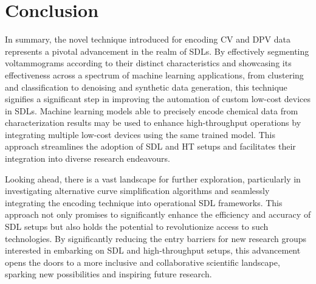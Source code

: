 \chapter{Conclusion} \label{chap:chap-5}
In summary, the novel technique introduced for encoding CV and DPV data represents a pivotal advancement in the realm of SDLs. By effectively segmenting voltammograms according to their distinct characteristics and showcasing its effectiveness across a spectrum of machine learning applications, from clustering and classification to denoising and synthetic data generation, this technique signifies a significant step in improving the automation of custom low-cost devices in SDLs. Machine learning models able to precisely encode chemical data from characterization results may be used to enhance high-throughput operations by integrating multiple low-cost devices using the same trained model. This approach streamlines the adoption of SDL and HT setups and facilitates their integration into diverse research endeavours.

Looking ahead, there is a vast landscape for further exploration, particularly in investigating alternative curve simplification algorithms and seamlessly integrating the encoding technique into operational SDL frameworks. This approach not only promises to significantly enhance the efficiency and accuracy of SDL setups but also holds the potential to revolutionize access to such technologies. By significantly reducing the entry barriers for new research groups interested in embarking on SDL and high-throughput setups, this advancement opens the doors to a more inclusive and collaborative scientific landscape, sparking new possibilities and inspiring future research.